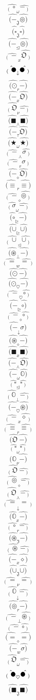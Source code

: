 \documentclass[12pt]{article}
\begin{document}
\begin{multicols}{5}
$$\hat{_( \ \circ} _\omega \hat{-\ _)}$$
$$\hat{(-} _\mathfrak{J} \hat{\circledcirc)}$$
$$\hat{(\square} _\mathfrak{J} \hat{\square)}$$
$$\hat{(-} _\trianglelefteq \hat{\circledcirc)}$$
$$\hat{_( \ -} _x \hat{\mathfrak{O}\ _)}$$
$$\hat{_( \ \newmoon} _\downarrow \hat{\newmoon\ _)}$$
$$\hat{(\odot} _r \hat{-)}$$
$$\hat{(-} _x \hat{\mathfrak{O})}$$
$$\hat{_( \ \mathfrak{O}} _\nu \hat{-\ _)}$$
$$\hat{(\blacksquare} _\curlywedge \hat{\blacksquare)}$$
$$\hat{(-} _\tau \hat{\mathfrak{O})}$$
$$\hat{(\bigstar} _\omega \hat{\bigstar)}$$
$$\hat{_( \ -} _\curlywedge \hat{\sigma\ _)}$$
$$\hat{_( \ -} _r \hat{\sigma\ _)}$$
$$\hat{(-} _\diamond \hat{\mathfrak{O})}$$
$$\hat{(\equiv} _r \hat{\equiv)}$$
$$\hat{_( \ -} _\diamond \hat{\circledcirc\ _)}$$
$$\hat{_( \ \sigma} _\omega \hat{-\ _)}$$
$$\hat{(\circ} _\trianglerighteq \hat{-)}$$
$$\hat{(\cup} _\trianglerighteq \hat{\cup)}$$
$$\hat{_( \ \cup} _\trianglelefteq \hat{\cup\ _)}$$
$$\hat{(\circledast} _\bot \hat{-)}$$
$$\hat{_( \ =} _w \hat{=\ _)}$$
$$\hat{(\odot} \  \hat{-)}$$
$$\hat{(\odot} _\heartsuit \hat{-)}$$
$$\hat{_( \ -} _\heartsuit \hat{\circ\ _)}$$
$$\hat{(-} _\trianglerighteq \hat{\circ)}$$
$$\hat{_( \ -} _\diamond \hat{\circ\ _)}$$
$$\hat{(-} _\downarrow \hat{\sigma)}$$
$$\hat{(\circledast} _\diamond \hat{-)}$$
$$\hat{(\blacksquare} _x \hat{\blacksquare)}$$
$$\hat{(-} _\curlywedge \hat{\mathfrak{O})}$$
$$\hat{(-} _\omega \hat{\mathbb{O})}$$
$$\hat{_( \ \square} _\trianglelefteq \hat{\square\ _)}$$
$$\hat{_( \ \mathbb{O}} _\bot \hat{-\ _)}$$
$$\hat{(-} _\heartsuit \hat{\circledast)}$$
$$\hat{_( \ -} _x \hat{\diamond\ _)}$$
$$\hat{_( \ \equiv} _r \hat{\equiv\ _)}$$
$$\hat{(\mathfrak{O}} \  \hat{-)}$$
$$\hat{_( \ \square} _\omega \hat{\square\ _)}$$
$$\hat{(\mathbb{O}} _\nu \hat{-)}$$
$$\hat{_( \ \mathfrak{O}} \  \hat{-\ _)}$$
$$\hat{_( \ \circledcirc} _\diamond \hat{-\ _)}$$
$$\hat{_( \ \mathfrak{O}} _\curlywedge \hat{-\ _)}$$
$$\hat{_( \ =} _\downarrow \hat{=\ _)}$$
$$\hat{(\mathbb{O}} _x \hat{-)}$$
$$\hat{_( \ \circ} _r \hat{-\ _)}$$
$$\hat{(\circledast} _\mathfrak{I} \hat{-)}$$
$$\hat{_( \ \circledast} \  \hat{-\ _)}$$
$$\hat{(-} _x \hat{\diamond)}$$
$$\hat{(\cup} _\mathfrak{J} \hat{\cup)}$$
$$\hat{_( \ =} _\nu \hat{=\ _)}$$
$$\hat{_( \ \mathbb{O}} _\downarrow \hat{-\ _)}$$
$$\hat{(\circledcirc} _r \hat{-)}$$
$$\hat{_( \ -} _\bot \hat{\circledast\ _)}$$
$$\hat{_( \ -} \  \hat{\circ\ _)}$$
$$\hat{(=} _\diamond \hat{=)}$$
$$\hat{(-} _w \hat{\sigma)}$$
$$\hat{_( \ \mathfrak{O}} _\omega \hat{-\ _)}$$
$$\hat{_( \ \newmoon} _\heartsuit \hat{\newmoon\ _)}$$
$$\hat{(\blacksquare} _\mathfrak{J} \hat{\blacksquare)}$$

\end{multicols}
\end{document}
